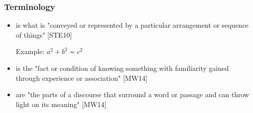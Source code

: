 \begin{frame}
  \frametitle{Terminology}
  \begin{module}[id=terminology]

  \begin{itemize}
  \item \begin{definition}  is what is "conveyed or represented by a particular arrangement or sequence of things" [STE10]\end{definition}
   Example: \textit{$a^2 + b^2 = c^2$}
  \item \begin{definition}  is the "fact or condition of knowing something with familiarity gained through experience or association" [MW14] \end{definition}
  \item \begin{definition}  are "the parts of a discourse that surround a word or passage and can throw light on its meaning" [MW14]\end{definition}
  \end{itemize}
  \end{module}
\end{frame}
